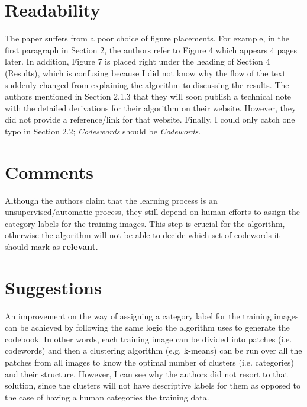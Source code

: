 \documentclass[11pt,a4paper]{article}
\begin{document}
\section{Readability}
The paper suffers from a poor choice of figure placements. For example, in the first paragraph in Section 2, the authors refer to Figure 4 which appears 4 pages
later. In addition, Figure 7 is placed right under the heading of Section 4 (Results), which is confusing because I did not know why the flow of the text
suddenly changed from explaining the algorithm to discussing the results. The authors mentioned in Section 2.1.3 that they will soon publish a technical note
with the detailed derivations for their algorithm on their website. However, they did not provide a reference/link for that website. Finally, I could only catch
one typo in Section 2.2; \textit{Codeswords} should be \textit{Codewords}.

\section{Comments}
Although the authors claim that the learning process is an unsupervised/automatic process, they still depend on human efforts to assign the category labels for
the training images. This step is crucial for the algorithm, otherwise the algorithm will not be able to decide which set of codewords it should mark as
\textbf{relevant}.

\section{Suggestions}
An improvement on the way of assigning a category label for the training images can be achieved by following the same logic the algorithm uses to generate the
codebook. In other words, each training image can be divided into patches (i.e. codewords) and then a clustering algorithm (e.g. k-means) can be run over all
the patches from all images to know the optimal number of clusters (i.e. categories) and their structure. However, I can see why the authors did not resort to
that solution, since the clusters will not have descriptive labels for them as opposed to the case of having a human categories the training data.

\end{document}
